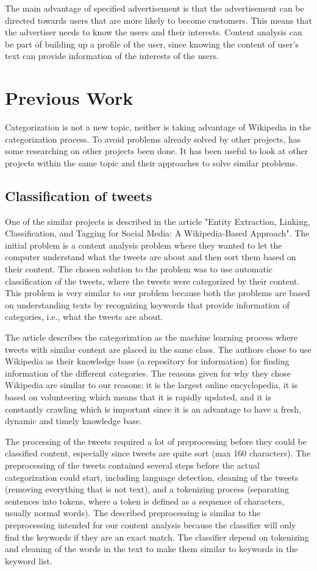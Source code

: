 \documentclass[english,a4paper]{ifimaster}
\begin{document}
The main advantage of specified advertisement is that the advertisement can be directed towards users that are more likely to become customers. This means that the advertiser needs to know the users and their interests. Content analysis can be part of building up a profile of the user, since knowing the content of user's text can provide information of the interests of the users. 

\part{Previous Work}
Categorization is not a new topic, neither is taking advantage of Wikipedia in the categorization process. To avoid problems already solved by other projects, has some researching on other projects been done. It has been useful to look at other projects within the same topic and their approaches to solve similar problems. 

\chapter{Classification of tweets}
One of the similar projects is described in the article "Entity Extraction, Linking, Classification, and Tagging for Social Media: A Wikipedia-Based Approach"\cite{entityextraction}. The initial problem is a content analysis problem where they wanted to let the computer understand what the tweets are about and then sort them based on their content. The chosen solution to the problem was to use automatic classification of the tweets, where the tweets were categorized by their content. This problem is very similar to our problem because both the problems are based on understanding texts by recognizing keywords that provide information of categories, i.e., what the tweets are about.

The article describes the categorization as the machine learning process where tweets with similar content are placed in the same class. The authors chose to use Wikipedia as their knowledge base (a repository for information) for finding information of the different categories. The reasons given for why they chose Wikipedia are similar to our reasons;  it is the largest online encyclopedia, it is based on volunteering which means that it is rapidly updated, and it is constantly crawling which is important since it is an advantage to have a fresh, dynamic and timely knowledge base. 

The processing of the tweets required a lot of preprocessing before they could be classified content, especially since tweets are quite sort (max 160 characters).  The preprocessing of the tweets contained several steps before the actual categorization could start, including language detection, cleaning of the tweets (removing everything that is not text), and a tokenizing process (separating sentences into tokens, where a token is defined as a sequence of characters, usually normal words). The described preprocessing is similar to the preprocessing intended for our content analysis because the classifier will only find the keywords if they are an exact match. The classifier depend on tokenizing and cleaning of the words in the text to make them similar to keywords in the keyword list.  
\end{document}
